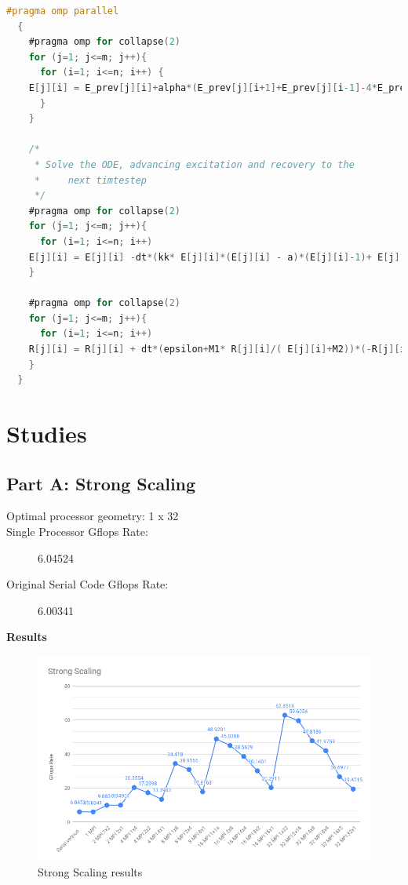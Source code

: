 \documentclass{article}
\begin{document}
\begin{lstlisting}[language=C]
#pragma omp parallel 
  {
    #pragma omp for collapse(2)
    for (j=1; j<=m; j++){
      for (i=1; i<=n; i++) {
	E[j][i] = E_prev[j][i]+alpha*(E_prev[j][i+1]+E_prev[j][i-1]-4*E_prev[j][i]+E_prev[j+1][i]+E_prev[j-1][i]);
      }
    }
    
    /* 
     * Solve the ODE, advancing excitation and recovery to the
     *     next timtestep
     */
    #pragma omp for collapse(2)
    for (j=1; j<=m; j++){
      for (i=1; i<=n; i++)
	E[j][i] = E[j][i] -dt*(kk* E[j][i]*(E[j][i] - a)*(E[j][i]-1)+ E[j][i] *R[j][i]);
    }
    
    #pragma omp for collapse(2)
    for (j=1; j<=m; j++){
      for (i=1; i<=n; i++)
	R[j][i] = R[j][i] + dt*(epsilon+M1* R[j][i]/( E[j][i]+M2))*(-R[j][i]-kk* E[j][i]*(E[j][i]-b-1));
    }
  }
\end{lstlisting}

\newpage

\section{Studies}
\subsection{Part A: Strong Scaling}
\begin{description}
    \item[Optimal processor geometry: 1 x 32] \hfill 
    \item[Single Processor Gflops Rate: ] 6.04524  \hfill
    \item[Original Serial Code Gflops Rate: ] 6.00341 \hfill
    
\end{description}

\textbf{Results}
\begin{figure}[!htb]
    \centering
    \includegraphics[width=1\linewidth]{./img/Strong-Scaling.png}
    \caption{Strong Scaling results}
\end{figure}   
\end{document}
